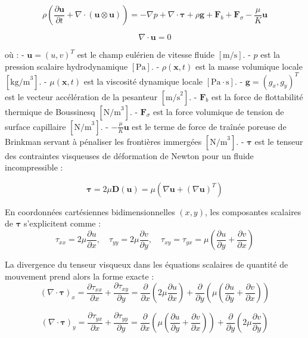 \documentclass[
  french,
]{article}
\begin{document}
\[\rho \left( \frac{\partial \mathbf{u}}{\partial t} + \nabla \cdot (\mathbf{u} \otimes \mathbf{u}) \right) = - \nabla p + \nabla \cdot \boldsymbol{\tau} + \rho \mathbf{g} + \mathbf{F}_b + \mathbf{F}_\sigma - \frac{\mu}{K} \mathbf{u}\]

\[\nabla \cdot \mathbf{u} = 0\]

où : - \(\mathbf{u} = (u, v)^T\) est le champ eulérien de vitesse fluide
\([\text{m/s}]\). - \(p\) est la pression scalaire hydrodynamique
\([\text{Pa}]\). - \(\rho(\mathbf{x}, t)\) est la masse volumique locale
\([\text{kg/m}^3]\). - \(\mu(\mathbf{x}, t)\) est la viscosité dynamique
locale \([\text{Pa}\cdot\text{s}]\). - \(\mathbf{g} = (g_x, g_y)^T\) est
le vecteur accélération de la pesanteur \([\text{m/s}^2]\). -
\(\mathbf{F}_b\) est la force de flottabilité thermique de Boussinesq
\([\text{N/m}^3]\). - \(\mathbf{F}_\sigma\) est la force volumique de
tension de surface capillaire \([\text{N/m}^3]\). -
\(-\frac{\mu}{K} \mathbf{u}\) est le terme de force de traînée poreuse
de Brinkman servant à pénaliser les frontières immergées
\([\text{N/m}^3]\). - \(\boldsymbol{\tau}\) est le tenseur des
contraintes visqueuses de déformation de Newton pour un fluide
incompressible :

\[\boldsymbol{\tau} = 2 \mu \mathbf{D}(\mathbf{u}) = \mu \left( \nabla \mathbf{u} + (\nabla \mathbf{u})^T \right)\]

En coordonnées cartésiennes bidimensionnelles \((x, y)\), les
composantes scalaires de \(\boldsymbol{\tau}\) s'explicitent comme :
\[\tau_{xx} = 2 \mu \frac{\partial u}{\partial x}, \quad \tau_{yy} = 2 \mu \frac{\partial v}{\partial y}, \quad \tau_{xy} = \tau_{yx} = \mu \left( \frac{\partial u}{\partial y} + \frac{\partial v}{\partial x} \right)\]

La divergence du tenseur visqueux dans les équations scalaires de
quantité de mouvement prend alors la forme exacte :
\[(\nabla \cdot \boldsymbol{\tau})_x = \frac{\partial \tau_{xx}}{\partial x} + \frac{\partial \tau_{xy}}{\partial y} = \frac{\partial}{\partial x}\left( 2\mu \frac{\partial u}{\partial x} \right) + \frac{\partial}{\partial y}\left( \mu \left( \frac{\partial u}{\partial y} + \frac{\partial v}{\partial x} \right) \right)\]

\[(\nabla \cdot \boldsymbol{\tau})_y = \frac{\partial \tau_{yx}}{\partial x} + \frac{\partial \tau_{yy}}{\partial y} = \frac{\partial}{\partial x}\left( \mu \left( \frac{\partial u}{\partial y} + \frac{\partial v}{\partial x} \right) \right) + \frac{\partial}{\partial y}\left( 2\mu \frac{\partial v}{\partial y} \right)\]
\end{document}
